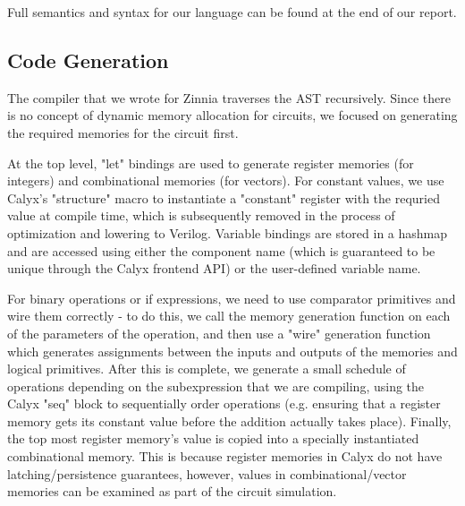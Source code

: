 \documentclass[12pt]{article}
\begin{document}
Full semantics and syntax for our language can be found at the end of our report.

\subsection{Code Generation}
The compiler that we wrote for Zinnia traverses the AST recursively. Since there is no concept of dynamic
memory allocation for circuits, we focused on generating the required memories for the circuit first.

At the top level, "let" bindings are used to generate register memories (for integers) and combinational memories
(for vectors). For constant values, we use Calyx's "structure" macro to instantiate a "constant" register with the
requried value at compile time, which is subsequently removed in the process of optimization and lowering to Verilog.
Variable bindings are stored in a hashmap and are accessed using either the component name (which is guaranteed
to be unique through the Calyx frontend API) or the user-defined variable name.

For binary operations or if expressions, we need to use comparator primitives and wire them correctly - to do this,
we call the memory generation function on each of the parameters of the operation, and then use a "wire"
generation function which generates assignments between the inputs and outputs of the memories and logical primitives.
After this is complete, we generate a small schedule of operations depending on the subexpression that we are compiling, using
the Calyx "seq" block to sequentially order operations (e.g. ensuring that a register memory gets its constant value
before the addition actually takes place). Finally, the top most register memory's value is copied into a specially
instantiated combinational memory. This is because register memories in Calyx do not have latching/persistence guarantees,
however, values in combinational/vector memories can be examined as part of the circuit simulation.
\end{document}
